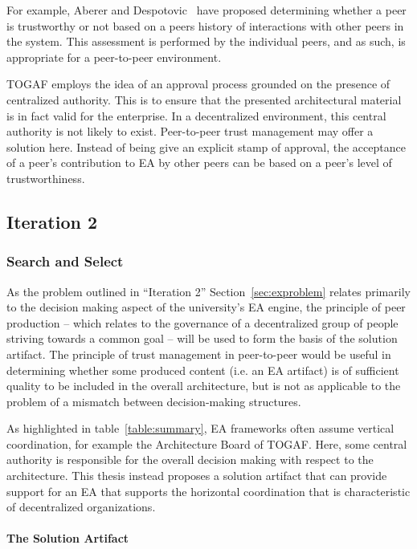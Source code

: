 For example, Aberer and Despotovic~\cite{aberer2001managing} have proposed determining whether a peer is trustworthy or not based on a peers history of interactions with other peers in the system. This assessment is performed by the individual peers, and as such, is appropriate for a peer-to-peer environment.

TOGAF employs the idea of an approval process grounded on the presence of centralized authority. This is to ensure that the presented architectural material is in fact valid for the enterprise. In a decentralized environment, this central authority is not likely to exist. Peer-to-peer trust management may offer a solution here. Instead of being give an explicit stamp of approval, the acceptance of a peer's contribution to EA by other peers can be based on a peer's level of trustworthiness. 

\subsection{Iteration 2}
\label{sec:design_iteration2}

\subsubsection*{Search and Select}

As the problem outlined in ``Iteration 2'' Section~\ref{sec:exproblem} relates primarily to the decision making aspect of the university's EA engine, the principle of peer production -- which relates to the governance of a decentralized group of people striving towards a common goal -- will be used to form the basis of the solution artifact.  The principle of trust management in peer-to-peer would be useful in determining whether some produced content (i.e. an EA artifact) is of sufficient quality to be included in the overall architecture, but is not as applicable to the problem of a mismatch between decision-making structures. 

As highlighted in table~\ref{table:summary}, EA frameworks often assume vertical coordination, for example the Architecture Board of TOGAF. Here, some central authority is responsible for the overall decision making with respect to the architecture. This thesis instead proposes a solution artifact that can provide support for an EA that supports the horizontal coordination that is characteristic of decentralized organizations.

\paragraph*{The Solution Artifact}

